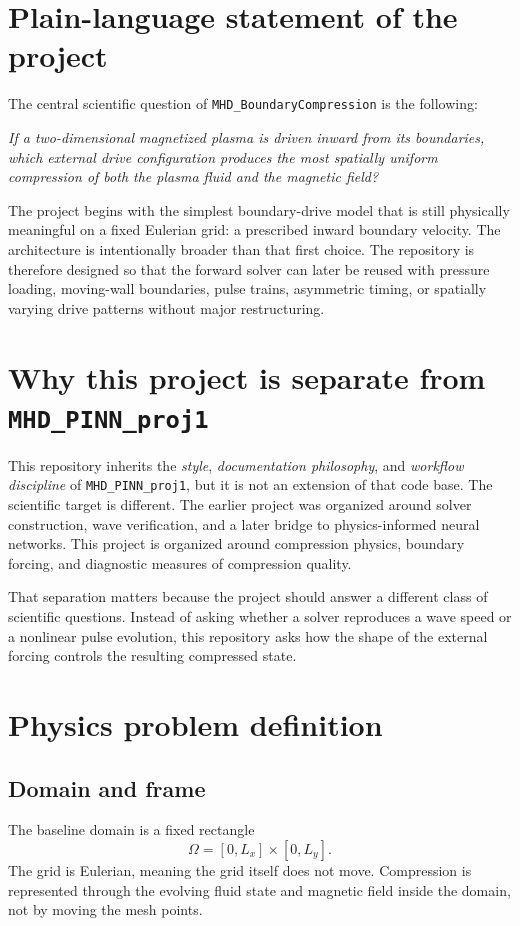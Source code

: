 \documentclass[11pt]{article}
\begin{document}
\section{Plain-language statement of the project}
The central scientific question of \texttt{MHD\_BoundaryCompression} is the following:
\begin{physicsbox}
\emph{If a two-dimensional magnetized plasma is driven inward from its boundaries, which external drive configuration produces the most spatially uniform compression of both the plasma fluid and the magnetic field?}
\end{physicsbox}
The project begins with the simplest boundary-drive model that is still physically meaningful on a fixed Eulerian grid: a prescribed inward boundary velocity. The architecture is intentionally broader than that first choice. The repository is therefore designed so that the forward solver can later be reused with pressure loading, moving-wall boundaries, pulse trains, asymmetric timing, or spatially varying drive patterns without major restructuring.

\section{Why this project is separate from \texttt{MHD\_PINN\_proj1}}
This repository inherits the \emph{style}, \emph{documentation philosophy}, and \emph{workflow discipline} of \texttt{MHD\_PINN\_proj1}, but it is not an extension of that code base. The scientific target is different. The earlier project was organized around solver construction, wave verification, and a later bridge to physics-informed neural networks. This project is organized around compression physics, boundary forcing, and diagnostic measures of compression quality.

That separation matters because the project should answer a different class of scientific questions. Instead of asking whether a solver reproduces a wave speed or a nonlinear pulse evolution, this repository asks how the shape of the external forcing controls the resulting compressed state.

\section{Physics problem definition}
\subsection{Domain and frame}
The baseline domain is a fixed rectangle
\[
\Omega = [0,L_x]\times[0,L_y].
\]
The grid is Eulerian, meaning the grid itself does not move. Compression is represented through the evolving fluid state and magnetic field inside the domain, not by moving the mesh points.
\end{document}
